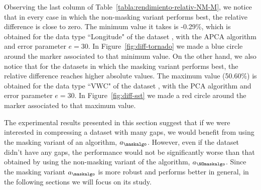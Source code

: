 Observing the last column of Table~\ref{tabla:rendimiento-relativ-NM-M}, we notice that in every case in which the non-masking variant performs best, the relative difference is close to zero. The minimum value it takes is -0.29\%, which is obtained for the data type ``Longitude" of the dataset \datasettornado, with the APCA algorithm and error parameter $e=30$. In Figure~\ref{fig:diff-tornado} we made a blue circle around the marker associated to that minimum value. On the other hand, we also notice that for the datasets in which the masking variant performs best, the relative difference reaches higher absolute values. The maximum value (50.60\%) is obtained for the data type ``VWC" of the dataset \datasetsst, with the PCA algorithm and error parameter $e=30$. In Figure~\ref{fig:diff-sst} we made a red circle around the marker associated to that maximum value.


The experimental results presented in this section suggest that if we were interested in compressing a dataset with many gaps, we would benefit from using the masking variant of an algorithm, $a_\maskalgo$. However, even if the dataset didn't have any gaps, the performance would not be significantly worse than that obtained by using the non-masking variant of the algorithm, $a_\NOmaskalgo$. Since the masking variant $a_\maskalgo$ is more robust and performs better in general, in the following sections we will focus on its study.
